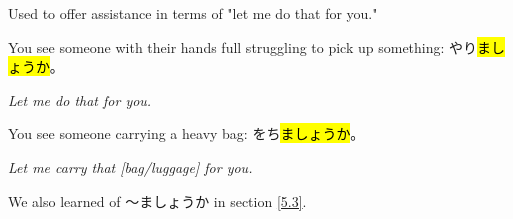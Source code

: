     {
    Used to offer assistance in terms of "let me do that for you."
    
    You see someone with their hands full struggling to pick up something: 
    やり\hl{ましょうか}。
    
    \textit{Let me do that for you.}
    
    \sectionSplit
    
    You see someone carrying a heavy bag: をち\hl{ましょうか}。
    
    \textit{Let me carry that [bag/luggage] for you.}
    
    We also learned of 〜ましょうか in section \ref{5.3}.
    }